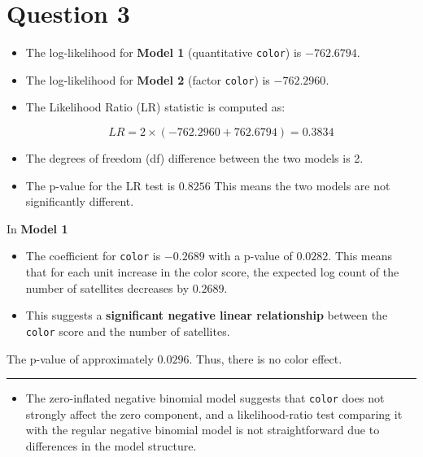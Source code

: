 \documentclass{article}
\begin{document}
\section*{Question 3}




\begin{itemize}
    \item The log-likelihood for \textbf{Model 1} (quantitative \texttt{color}) is $-762.6794$.
    \item The log-likelihood for \textbf{Model 2} (factor \texttt{color}) is $-762.2960$.
    \item The Likelihood Ratio (LR) statistic is computed as:

    \[
    LR = 2 \times (-762.2960 + 762.6794) = 0.3834
    \]

    \item The degrees of freedom (df) difference between the two models is 2.
    \item The p-value for the LR test is $0.8256$ This means the two models are not significantly different.
\end{itemize}




In \textbf{Model 1}
\begin{itemize}
    \item The coefficient for \texttt{color} is $-0.2689$ with a p-value of $0.0282$. This means that for each unit increase in the color score, the expected log count of the number of satellites decreases by $0.2689$.
    \item This suggests a \textbf{significant negative linear relationship} between the \texttt{color} score and the number of satellites.
\end{itemize}

The p-value of approximately $0.0296$. Thus, there is no color effect.


\rule{\linewidth}{0.1mm}

\begin{itemize}

    \item The zero-inflated negative binomial model suggests that \texttt{color} does not strongly affect the zero component, and a likelihood-ratio test comparing it with the regular negative binomial model is not straightforward due to differences in the model structure.
\end{itemize}
\end{document}
